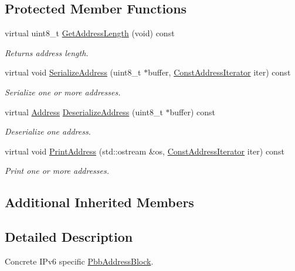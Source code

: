 \subsection*{Protected Member Functions}
\begin{DoxyCompactItemize}
\item 
virtual uint8\+\_\+t \hyperlink{classns3_1_1PbbAddressBlockIpv6_abdbbd329cec7960599c2f99e4cc4756d}{Get\+Address\+Length} (void) const 
\begin{DoxyCompactList}\small\item\em Returns address length. \end{DoxyCompactList}\item 
virtual void \hyperlink{classns3_1_1PbbAddressBlockIpv6_a96952f2acc33614630a2cc35d067c470}{Serialize\+Address} (uint8\+\_\+t $\ast$buffer, \hyperlink{classns3_1_1PbbAddressBlock_ac1f10df8f85c0c8d4b729352bc32a7cf}{Const\+Address\+Iterator} iter) const 
\begin{DoxyCompactList}\small\item\em Serialize one or more addresses. \end{DoxyCompactList}\item 
virtual \hyperlink{classns3_1_1Address}{Address} \hyperlink{classns3_1_1PbbAddressBlockIpv6_ab0d0104b584191568b975f22fd90f56c}{Deserialize\+Address} (uint8\+\_\+t $\ast$buffer) const 
\begin{DoxyCompactList}\small\item\em Deserialize one address. \end{DoxyCompactList}\item 
virtual void \hyperlink{classns3_1_1PbbAddressBlockIpv6_ab702917910a77fcfcc33a64d31c250f8}{Print\+Address} (std\+::ostream \&os, \hyperlink{classns3_1_1PbbAddressBlock_ac1f10df8f85c0c8d4b729352bc32a7cf}{Const\+Address\+Iterator} iter) const 
\begin{DoxyCompactList}\small\item\em Print one or more addresses. \end{DoxyCompactList}\end{DoxyCompactItemize}
\subsection*{Additional Inherited Members}


\subsection{Detailed Description}
Concrete I\+Pv6 specific \hyperlink{classns3_1_1PbbAddressBlock}{Pbb\+Address\+Block}. 

